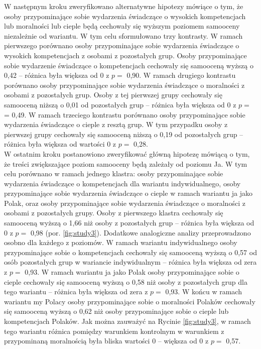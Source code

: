 \documentclass[man]{apa6}
\begin{document}
W następnym kroku zweryfikowano alternatywne hipotezy mówiące o tym, że osoby przypominające sobie wydarzenia świadczące o wysokich kompetencjach lub moralności lub cieple będą cechowały się wyższym poziomem samooceny niezależnie od wariantu. W tym celu sformułowano trzy kontrasty. W ramach pierwszego porównano osoby przypominające sobie wydarzenia świadczące o wysokich kompetencjach z osobami z pozostałych grup. Osoby przypominające sobie wydarzenie świadczące o kompetencjach cechowały się samooceną wyższą o 0,42 -- różnica była większa od 0 z $p =$ 0,90. W ramach drugiego kontrastu porównano osoby przypominające sobie wydarzenia świadczące o moralności z osobami z pozostałych grup. Osoby z tej pierwszej grupy cechowały się samooceną niższą o 0,01 od pozostałych grup -- różnica była większa od 0 z $p =$ = 0,49. W ramach trzeciego kontrastu porównano osoby przypominające sobie wydarzenia świadczące o cieple z resztą grup. W tym przypadku osoby z pierwszej grupy cechowały się samooceną niższą o 0,19 od pozostałych grup -- różnica była większa od wartości 0 z $p =$ 0,28. \\
W ostatnim kroku postanowiono zweryfikować główną hipotezę mówiącą o tym, że treści zwiększające poziom samooceny będą zależały od poziomu Ja. W tym celu porównano w ramach jednego klastra: osoby przypominające sobie wydarzenia świadczące o kompetencjach dla wariantu indywidualnego, osoby przypominające sobie wydarzenia świadczące o cieple w ramach wariantu ja jako Polak, oraz osoby przypominające sobie wydarzenia świadczące o moralności z osobami z pozostałych grupy. Osoby z pierwszego klastra cechowały się samooceną wyższą o 1,66 niż osoby z pozostałych grup -- różnica była większa od 0 z $p =$ 0,98 (por. \ref{fig:study3}). Dodatkowe analogiczne analizy przeprowadzono osobno dla każdego z poziomów. W ramach wariantu indywidualnego osoby przypominające sobie o kompetencjach cechowały się samooceną wyższą o 0,57 od osób pozostałych grup w wariancie indywidualnym -- różnica była większa od zera z $p =$ 0,93. W ramach wariantu ja jako Polak osoby przypominające sobie o cieple cechowały się samooceną wyższą o 0,58 niż osoby z pozostałych grup dla tego wariantu -- różnica była większa od zera z $p =$ 0,93. W końcu w ramach wariantu my Polacy osoby przypominające sobie o moralności Polaków cechowały się samooceną wyższą o 0,62 niż osoby przypominające sobie o cieple lub kompetencjach Polaków. Jak można zauważyć na Rycinie \ref{fig:study3}, w ramach tego wariantu różnica pomiędzy warunkiem kontrolnym w warunkiem z przypominaną moralnością była bliska wartości 0 -- większa od 0 z $p =$ 0,57.
\end{document}
